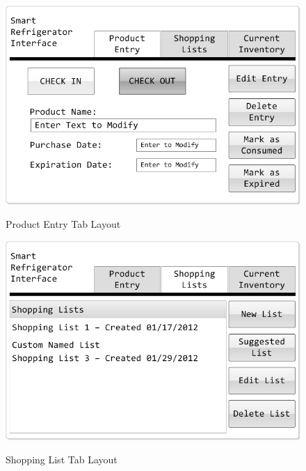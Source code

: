 \documentclass[11pt,letterpaper]{article}
\begin{document}
\begin{figure}[h!]
\begin{center}
\caption{Product Entry Tab Layout}
\includegraphics[scale=0.5]{MockUp1}
\label{mock1}
\end{center}
\end{figure}

\begin{figure}[h!]
\begin{center}
\caption{Shopping List Tab Layout}
\includegraphics[scale=0.5]{MockUp2}
\label{mock2}
\end{center}
\end{figure}
\end{document}
